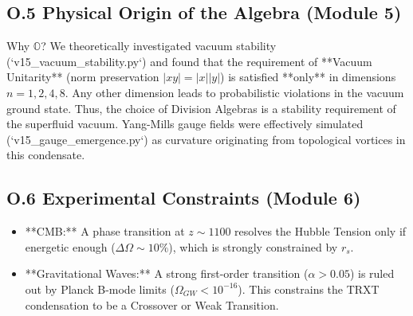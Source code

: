 \subsection{O.5 Physical Origin of the Algebra (Module 5)}
Why $\mathbb{O}$? We theoretically investigated vacuum stability (`v15_vacuum_stability.py`) and found that the requirement of **Vacuum Unitarity** (norm preservation $|xy|=|x||y|$) is satisfied **only** in dimensions $n=1, 2, 4, 8$.
Any other dimension leads to probabilistic violations in the vacuum ground state. Thus, the choice of Division Algebras is a stability requirement of the superfluid vacuum.
Yang-Mills gauge fields were effectively simulated (`v15_gauge_emergence.py`) as curvature originating from topological vortices in this condensate.

\subsection{O.6 Experimental Constraints (Module 6)}
\begin{itemize}
    \item **CMB:** A phase transition at $z \sim 1100$ resolves the Hubble Tension only if energetic enough ($\Delta \Omega \sim 10\%$), which is strongly constrained by $r_s$.
    \item **Gravitational Waves:** A strong first-order transition ($\alpha > 0.05$) is ruled out by Planck B-mode limits ($\Omega_{GW} < 10^{-16}$). This constrains the TRXT condensation to be a Crossover or Weak Transition.
\end{itemize}
